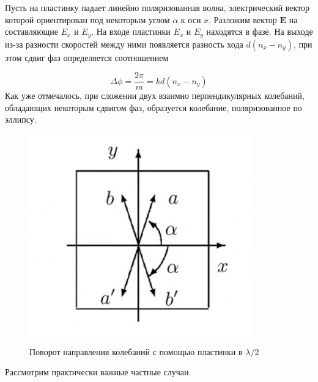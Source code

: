 \documentclass[14pt, a4paper]{report}
\begin{document}
Пусть на пластинку падает линейно поляризованная волна, электрический вектор которой ориентирован под некоторым углом $ \alpha $ к оси
$ x $. Разложим вектор $ \mathbf{E} $ на составляющие $ E_x $ и $ E_y $. На входе пластинки $ E_x $ и $ E_y $ находятся в фазе. На выходе из-за разности скоростей между ними появляется разность хода $ d(n_x - n_y) $, при этом сдвиг фаз определяется соотношением

\begin{equation}\label{}
\Delta \phi =  \dfrac{2\pi}{m} = k d(n_x - n_y)
\end{equation}
Как уже отмечалось, при сложении двух взаимно перпендикулярных колебаний, обладающих некоторым сдвигом фаз, образуется колебание, поляризованное по эллипсу.

\begin{figure}
	\includegraphics[width=\linewidth]{../images/473_2}
	\caption{Поворот направления колебаний с помощью пластинки в $ \lambda / 2 $}
	\label{ris 2}
\end{figure}


Рассмотрим практически важные частные случаи.
\end{document}
